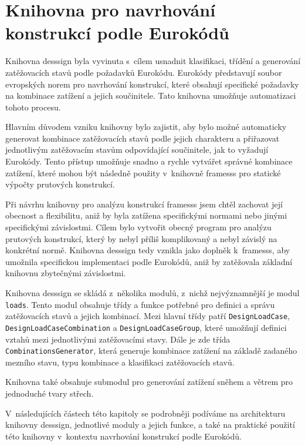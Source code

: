 \chapter{Knihovna pro navrhování konstrukcí podle Eurokódů}

Knihovna desssign byla vyvinuta s~cílem usnadnit klasifikaci, třídění a generování zatěžovacích stavů podle požadavků Eurokódu. Eurokódy představují soubor evropských norem pro navrhování konstrukcí, které obsahují specifické požadavky na kombinace zatížení a jejich součinitele. Tato knihovna umožňuje automatizaci tohoto procesu.

Hlavním důvodem vzniku knihovny bylo zajistit, aby bylo možné automaticky generovat kombinace zatěžovacích stavů podle jejich charakteru a přiřazovat jednotlivým zatěžovacím stavům odpovídající součinitele, jak to vyžadují Eurokódy. Tento přístup umožňuje snadno a rychle vytvářet správné kombinace zatížení, které mohou být následně použity v~knihovně framesss pro statické výpočty prutových konstrukcí.

Při návrhu knihovny pro analýzu konstrukcí framesss jsem chtěl zachovat její obecnost a flexibilitu, aniž by byla zatížena specifickými normami nebo jinými specifickými závislostmi. Cílem bylo vytvořit obecný program pro analýzu prutových konstrukcí, který by nebyl příliš komplikovaný a nebyl závislý na konkrétní normě. Knihovna desssign tedy vznikla jako doplněk k~framesss, aby umožnila specifickou implementaci podle Eurokódů, aniž by zatěžovala základní knihovnu zbytečnými závislostmi.

Knihovna desssign se skládá z~několika modulů, z~nichž nejvýznamnější je modul \texttt{loads}. Tento modul obsahuje třídy a funkce potřebné pro definici a správu zatěžovacích stavů a jejich kombinací. Mezi hlavní třídy patří \texttt{DesignLoadCase}, \texttt{DesignLoadCaseCombination} a \texttt{DesignLoadCaseGroup}, které umožňují definici vztahů mezi jednotlivými zatěžovacími stavy. Dále je zde třída \texttt{CombinationsGenerator}, která generuje kombinace zatížení na základě zadaného mezního stavu, typu kombinace a klasifikaci zatěžovacích stavů.

Knihovna také obsahuje submodul pro generování zatížení sněhem a větrem pro jednoduché tvary střech.

V~následujících částech této kapitoly se podrobněji podíváme na architekturu knihovny desssign, jednotlivé moduly a jejich funkce, a také na praktické použití této knihovny v~kontextu navrhování konstrukcí podle Eurokódů.

